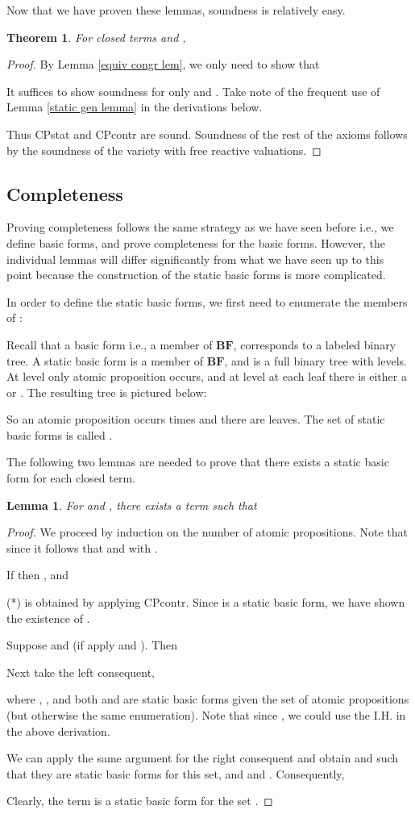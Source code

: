 \documentclass[a4paper,twoside,openright]{report}
\newcommand{\BF}{\ensuremath{\textbf{BF}}}
\newcommand{\CPcontr}{\ensuremath{\mathrm{CPcontr}}}
\newtheorem{lem}[theorem]{Lemma}
\newtheorem{thm}[theorem]{Theorem}
\begin{document}
Now that we have proven these lemmas, soundness is relatively easy.
\begin{thm}
For closed terms  and ,

\end{thm}
\begin{proof}
By Lemma \ref{equiv congr lem}, we only need to show that

It suffices to show soundness for only  and . Take note of the frequent use of Lemma \ref{static gen lemma} in the derivations below.


Thus CPstat and CPcontr are sound. Soundness of the rest of the axioms follows by the soundness of the variety with free reactive valuations.
\end{proof}

\subsection{Completeness}
Proving completeness follows the same strategy as we have seen before i.e., we define basic forms, and prove completeness for the basic forms. However, the individual lemmas will differ significantly from what we have seen up to this point because the construction of the static basic forms is more complicated.  

In order to define the static basic forms, we first need to enumerate the members of :

Recall that a basic form i.e., a member of \BF, corresponds to a labeled binary tree. A static basic form is a member of \BF, and is a full binary tree with  levels. At level  only atomic proposition  occurs, and at level  at each leaf there is either a  or . The resulting tree is pictured below:

So an atomic proposition  occurs  times and there are  leaves. The set of static basic forms is called . 

The following two lemmas are needed to prove that there exists a static basic form for each closed term.
\begin{lem}\label{red lemma}
For  and , there exists a term  such that

\end{lem}
\begin{proof}
We proceed by induction on the number of atomic propositions. Note that since  it follows that  and  with .

If  then , and

(*) is obtained by applying \CPcontr. Since  is a static basic form, we have shown the existence of .

Suppose  and  (if  apply  and ). Then

Next take the left consequent,

where , , and both  and  are static basic forms given the set of atomic propositions  (but otherwise the same enumeration). Note that since , we could use the I.H. in the above derivation. 

We can apply the same argument for the right consequent  and obtain  and  such that they are static basic forms for this set, and  and . Consequently,

Clearly, the term  is a static basic form for the set .
\end{proof}
\end{document}
